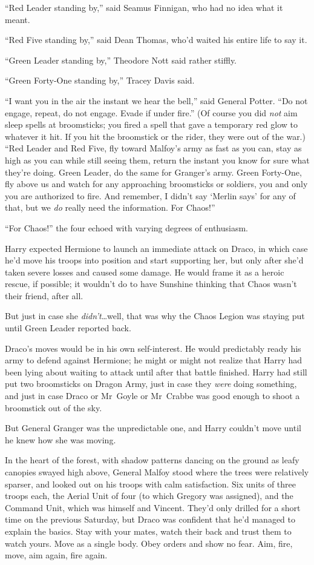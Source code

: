 “Red Leader standing by,” said Seamus Finnigan, who had no idea what it meant.

“Red Five standing by,” said Dean Thomas, who’d waited his entire life to say it.

“Green Leader standing by,” Theodore Nott said rather stiffly.

“Green Forty-One standing by,” Tracey Davis said.

“I want you in the air the instant we hear the bell,” said General Potter. “Do not engage, repeat, do not engage. Evade if under fire.” (Of course you did \emph{not} aim sleep spells at broomsticks; you fired a spell that gave a temporary red glow to whatever it hit. If you hit the broomstick or the rider, they were out of the war.) “Red Leader and Red Five, fly toward Malfoy’s army as fast as you can, stay as high as you can while still seeing them, return the instant you know for sure what they’re doing. Green Leader, do the same for Granger’s army. Green Forty-One, fly above us and watch for any approaching broomsticks or soldiers, you and only you are authorized to fire. And remember, I didn’t say ‘Merlin says’ for any of that, but we \emph{do} really need the information. For Chaos!”

“For Chaos!” the four echoed with varying degrees of enthusiasm.

Harry expected Hermione to launch an immediate attack on Draco, in which case he’d move his troops into position and start supporting her, but only after she’d taken severe losses and caused some damage. He would frame it as a heroic rescue, if possible; it wouldn’t do to have Sunshine thinking that Chaos wasn’t their friend, after all.

But just in case she \emph{didn’t}…well, that was why the Chaos Legion was staying put until Green Leader reported back.

Draco’s moves would be in his own self-interest. He would predictably ready his army to defend against Hermione; he might or might not realize that Harry had been lying about waiting to attack until after that battle finished. Harry had still put two broomsticks on Dragon Army, just in case they \emph{were} doing something, and just in case Draco or Mr~Goyle or Mr~Crabbe was good enough to shoot a broomstick out of the sky.

But General Granger was the unpredictable one, and Harry couldn’t move until he knew how she was moving.

\later

In the heart of the forest, with shadow patterns dancing on the ground as leafy canopies swayed high above, General Malfoy stood where the trees were relatively sparser, and looked out on his troops with calm satisfaction. Six units of three troops each, the Aerial Unit of four (to which Gregory was assigned), and the Command Unit, which was himself and Vincent. They’d only drilled for a short time on the previous Saturday, but Draco was confident that he’d managed to explain the basics. Stay with your mates, watch their back and trust them to watch yours. Move as a single body. Obey orders and show no fear. Aim, fire, move, aim again, fire again.

